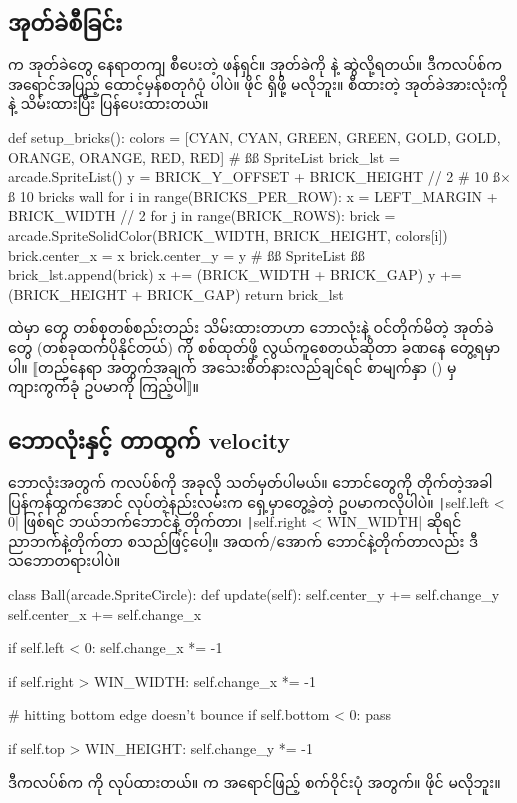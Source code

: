 \subsection*{အုတ်ခဲစီခြင်း}
 က အုတ်ခဲတွေ နေရာတကျ စီပေးတဲ့ ဖန်ရှင်။ အုတ်ခဲကို  နဲ့ ဆွဲလို့ရတယ်။ ဒီကလပ်စ်က အရောင်အပြည့် ထောင့်မှန်စတုဂံပုံ   ပါပဲ။   ဖိုင် ရှိဖို့ မလိုဘူး။ စီထားတဲ့ အုတ်ခဲအားလုံးကို  နဲ့ သိမ်းထားပြီး  ပြန်ပေးထားတယ်။
%
%
\begin{py}
def setup_bricks():
    colors = [CYAN, CYAN, GREEN, GREEN, GOLD, GOLD,
              ORANGE, ORANGE, RED, RED]
    # ßß SpriteList
    brick_lst = arcade.SpriteList()
    y = BRICK_Y_OFFSET + BRICK_HEIGHT // 2
    # 10 ß$\times$ß 10 bricks wall
    for i in range(BRICKS_PER_ROW):
        x = LEFT_MARGIN + BRICK_WIDTH // 2
        for j in range(BRICK_ROWS):
            brick = arcade.SpriteSolidColor(BRICK_WIDTH,
                                            BRICK_HEIGHT,
                                            colors[i])
            brick.center_x = x
            brick.center_y = y
            # ßß SpriteList ßß
            brick_lst.append(brick)
            x += (BRICK_WIDTH + BRICK_GAP)
        y += (BRICK_HEIGHT + BRICK_GAP)
    return brick_lst
\end{py}
%
%
 ထဲမှာ  တွေ တစ်စုတစ်စည်းတည်း သိမ်းထားတာဟာ ဘောလုံးနဲ့ ဝင်တိုက်မိတဲ့ အုတ်ခဲတွေ (တစ်ခုထက်ပိုနိုင်တယ်) ကို စစ်ထုတ်ဖို့ လွယ်ကူစေတယ်ဆိုတာ ခဏနေ တွေ့ရမှာပါ။ $\big\llbracket$တည်နေရာ အတွက်အချက် အသေးစိတ်နားလည်ချင်ရင်  စာမျက်နှာ (\fRefNo{\pageref{subsec:ch07chkbrd}}) မှ ကျားကွက်ခုံ ဥပမာကို ကြည့်ပါ$\big\rrbracket$။

\subsection*{ဘောလုံးနှင့် တာထွက် velocity}
ဘောလုံးအတွက်  ကလပ်စ်ကို အခုလို သတ်မှတ်ပါမယ်။ ဘောင်တွေကို တိုက်တဲ့အခါ ပြန်ကန်ထွက်အောင် လုပ်တဲ့နည်းလမ်းက ရှေ့မှာတွေ့ခဲ့တဲ့ ဥပမာကလိုပါပဲ။ \texttt|self.left < 0| ဖြစ်ရင် ဘယ်ဘက်ဘောင်နဲ့ တိုက်တာ၊ \texttt|self.right < WIN_WIDTH| ဆိုရင် ညာဘက်နဲ့တိုက်တာ စသည်ဖြင့်ပေါ့။ အထက်/အောက် ဘောင်နဲ့တိုက်တာလည်း ဒီသဘောတရားပါပဲ။
%
\begin{py}
class Ball(arcade.SpriteCircle):
    def update(self):
        self.center_y += self.change_y
        self.center_x += self.change_x

        if self.left < 0:
            self.change_x *= -1

        if self.right > WIN_WIDTH:
            self.change_x *= -1

        # hitting bottom edge doesn't bounce 
        if self.bottom < 0:
            pass

        if self.top > WIN_HEIGHT:
            self.change_y *= -1
\end{py}
%
ဒီကလပ်စ်က  ကို  လုပ်ထားတယ်။  က အရောင်ဖြည့် စက်ဝိုင်းပုံ   အတွက်။   ဖိုင် မလိုဘူး။

